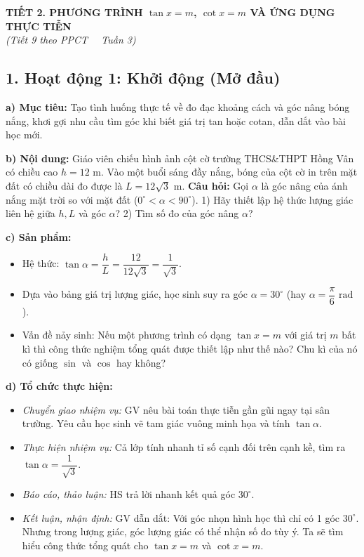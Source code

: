 \documentclass[12pt, a4paper]{article}
\begin{document}
\vspace{10pt}  
\begin{center}  
    {\fontsize{13pt}{16pt}\selectfont \textbf{TIẾT 2. PHƯƠNG TRÌNH $\tan x = m$, $\cot x = m$ VÀ ỨNG DỤNG THỰC TIỄN}}\\[2pt]  
    \textit{(Tiết 9 theo PPCT \ \textbar \ Tuần 3)}  
\end{center}  
  
\subsection*{1. Hoạt động 1: Khởi động (Mở đầu)}  
  
\noindent \textbf{a) Mục tiêu:}  
Tạo tình huống thực tế về đo đạc khoảng cách và góc nâng bóng nắng, khơi gợi nhu cầu tìm góc khi biết giá trị tan hoặc cotan, dẫn dắt vào bài học mới.  
  
\noindent \textbf{b) Nội dung:}  
Giáo viên chiếu hình ảnh cột cờ trường THCS\&THPT Hồng Vân có chiều cao $h = 12\text{ m}$. Vào một buổi sáng đầy nắng, bóng của cột cờ in trên mặt đất có chiều dài đo được là $L = 12\sqrt{3}\text{ m}$.  
\textbf{Câu hỏi:} Gọi $\alpha$ là góc nâng của ánh nắng mặt trời so với mặt đất ($0^\circ < \alpha < 90^\circ$).  
1) Hãy thiết lập hệ thức lượng giác liên hệ giữa $h, L$ và góc $\alpha$?  
2) Tìm số đo của góc nâng $\alpha$?  
  
\noindent \textbf{c) Sản phẩm:}  
\begin{itemize}[leftmargin=0.8cm]  
    \item Hệ thức: $\tan\alpha = \dfrac{h}{L} = \dfrac{12}{12\sqrt{3}} = \dfrac{1}{\sqrt{3}}$.  
    \item Dựa vào bảng giá trị lượng giác, học sinh suy ra góc $\alpha = 30^\circ$ (hay $\alpha = \dfrac{\pi}{6}\text{ rad}$).  
    \item Vấn đề nảy sinh: Nếu một phương trình có dạng $\tan x = m$ với giá trị $m$ bất kì thì công thức nghiệm tổng quát được thiết lập như thế nào? Chu kì của nó có giống $\sin$ và $\cos$ hay không?  
\end{itemize}  
  
\noindent \textbf{d) Tổ chức thực hiện:}  
\begin{itemize}[leftmargin=0.8cm]  
    \item \textit{Chuyển giao nhiệm vụ:} GV nêu bài toán thực tiễn gần gũi ngay tại sân trường. Yêu cầu học sinh vẽ tam giác vuông minh họa và tính $\tan\alpha$.  
    \item \textit{Thực hiện nhiệm vụ:} Cả lớp tính nhanh tỉ số cạnh đối trên cạnh kề, tìm ra $\tan\alpha = \dfrac{1}{\sqrt{3}}$.  
    \item \textit{Báo cáo, thảo luận:} HS trả lời nhanh kết quả góc $30^\circ$.  
    \item \textit{Kết luận, nhận định:} GV dẫn dắt: Với góc nhọn hình học thì chỉ có 1 góc $30^\circ$. Nhưng trong lượng giác, góc lượng giác có thể nhận số đo tùy ý. Ta sẽ tìm hiểu công thức tổng quát cho $\tan x = m$ và $\cot x = m$.  
\end{itemize}  
  
\end{document}
